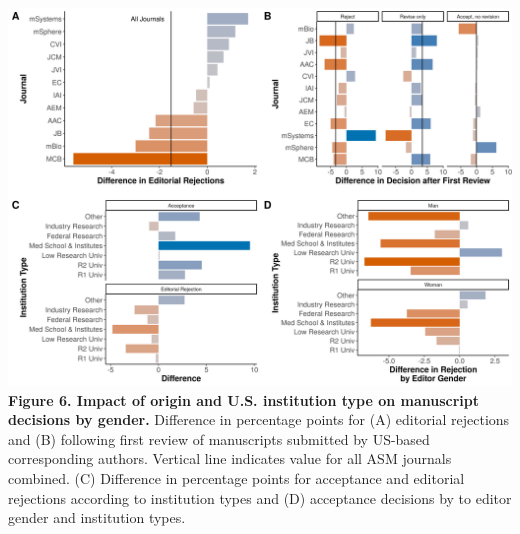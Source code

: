 \documentclass[11pt,]{article}
\begin{document}
\newpage

\includegraphics{Figure_6.png} \textbf{Figure 6. Impact of origin and
U.S. institution type on manuscript decisions by gender.} Difference in
percentage points for (A) editorial rejections and (B) following first
review of manuscripts submitted by US-based corresponding authors.
Vertical line indicates value for all ASM journals combined. (C)
Difference in percentage points for acceptance and editorial rejections
according to institution types and (D) acceptance decisions by to editor
gender and institution types.

\newpage
\end{document}
